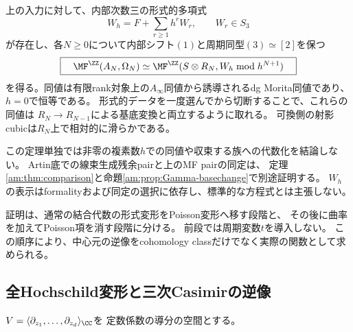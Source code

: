 \begin{theorem}[中心三次対の形式的MF復元]
\label{fo:thm:formal-reconstruction}
上の入力に対して、内部次数三の形式的多項式
\[
 W_h=F+\sum_{r\ge1}h^rW_r,\qquad W_r\in S_3
\]
が存在し、各$N\ge0$について内部シフト$(1)$と周期同型$(3)\simeq[2]$を保つ
\begin{equation}\label{fo:eq:MF-equivalence}
 \boxed{\quad
 \MF^{\ZZ}(A_N,\Omega_N)
 \simeq
 \MF^{\ZZ}(S\otimes R_N,W_h\bmod h^{N+1})
 \quad}
\end{equation}
を得る。同値は有限rank対象上の$A_\infty$同値から誘導されるdg Morita同値であり、
$h=0$で恒等である。
形式的データを一度選んでから切断することで、これらの同値は
$R_N\to R_{N-1}$による基底変換と両立するように取れる。
可換側の射影cubicは$R_N$上で相対的に滑らかである。

この定理単独では非零の複素数$h$での同値や収束する族への代数化を結論しない。
Artin底での線束生成残余pairと上のMF pairの同定は、
定理\ref{am:thm:comparison}と命題\ref{am:prop:Gamma-basechange}で別途証明する。
$W_h$の表示はformalityおよび同定の選択に依存し、標準的な方程式とは主張しない。
\end{theorem}

証明は、通常の結合代数の形式変形をPoisson変形へ移す段階と、
その後に曲率を加えてPoisson項を消す段階に分ける。
前段では周期変数$t$を導入しない。
この順序により、中心元の逆像をcohomology classだけでなく実際の関数として求められる。

\subsection{全Hochschild変形と三次Casimirの逆像}

$V=\langle\partial_{z_1},\ldots,\partial_{z_d}\rangle_\CC$を
定数係数の導分の空間とする。

